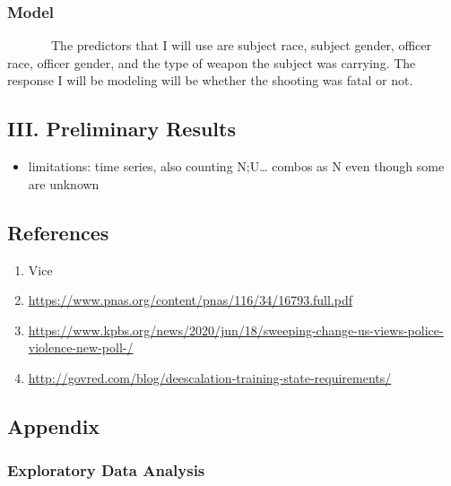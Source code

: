 \documentclass[
]{article}
\providecommand{\tightlist}{%
  \setlength{\itemsep}{0pt}\setlength{\parskip}{0pt}}
\begin{document}
\hypertarget{model}{%
\subsubsection{Model}\label{model}}

~~~~~~~The predictors that I will use are subject race, subject gender,
officer race, officer gender, and the type of weapon the subject was
carrying. The response I will be modeling will be whether the shooting
was fatal or not.

\hypertarget{iii.-preliminary-results}{%
\subsection{III. Preliminary Results}\label{iii.-preliminary-results}}

\begin{itemize}
\tightlist
\item
  limitations: time series, also counting N;U\ldots{} combos as N even
  though some are unknown
\end{itemize}

\hypertarget{references}{%
\subsection{References}\label{references}}

\begin{enumerate}
\def\labelenumi{\arabic{enumi})}
\tightlist
\item
  Vice
\item
  \url{https://www.pnas.org/content/pnas/116/34/16793.full.pdf}
\item
  \url{https://www.kpbs.org/news/2020/jun/18/sweeping-change-us-views-police-violence-new-poll-/}
\item
  \url{http://govred.com/blog/deescalation-training-state-requirements/}
\end{enumerate}

\hypertarget{appendix}{%
\subsection{Appendix}\label{appendix}}

\hypertarget{exploratory-data-analysis-1}{%
\subsubsection{Exploratory Data
Analysis}\label{exploratory-data-analysis-1}}
\end{document}
